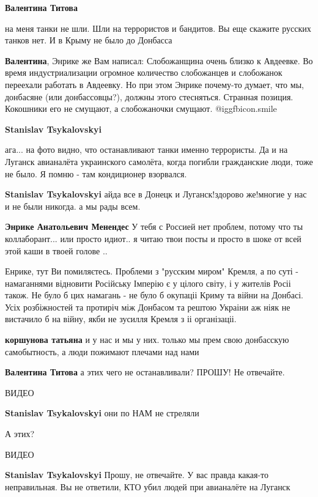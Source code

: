 \begin{itemize}
\begin{itemize}
\textbf{Валентина Титова} 

на меня танки не шли. Шли на террористов и бандитов.
Вы еще скажите русских танков нет.
И в Крыму не было до Донбасса

\textbf{Валентина}, Энрике же Вам написал: Слобожанщина очень близко к Авдеевке. Во время индустриализации огромное количество слобожанцев и слобожанок переехали работать в Авдеевку. Но при этом Энрике почему-то думает, что мы, донбасяне (или донбассовцы?), должны этого стесняться. Странная позиция. Кокошники его не смущают, а слобожаночки смущают.  @igg{fbicon.smile} 

\textbf{Stanislav Tsykalovskyi} 

ага... на фото видно, что останавливают танки именно террористы. Да и на Луганск
авианалёта украинского самолёта, когда погибли гражданские люди, тоже не было.
Я помню - там кондиционер взорвался.

\textbf{Stanislav Tsykalovskyi} айда все в Донецк и Луганск!здорово же!многие у нас и не были никогда. а мы рады всем.

\textbf{Энрике Анатольевич Менендес} У тебя с Россией нет проблем, потому что ты коллаборант... или просто идиот.. я читаю твои посты и просто в шоке от всей этой каши в твоей голове ..


Енрике, тут Ви помиляєтесь. Проблеми з "русским миром" Кремля, а по суті -
намаганнями відновити Російську Імперію є у цілого світу, і у жителів Росіі
також. Не було б цих намагань - не було б окупаціі Криму та війни на Донбасі.
Усіх розбіжностей та протиріч між Донбасом та рештою Украіни аж ніяк не
вистачило б на війну, якби не зусилля Кремля з іі організаціі.

\textbf{коршунова татьяна} и у нас и мы у них. только мы прем свою донбасскую самобытность, а люди пожимают плечами над нами

\textbf{Валентина Титова} а этих чего не останавливали?
ПРОШУ! Не отвечайте.

ВИДЕО

\textbf{Stanislav Tsykalovskyi} они по НАМ не стреляли

А этих?

ВИДЕО

\textbf{Stanislav Tsykalovskyi} Прошу, не отвечайте. У вас правда какая-то неправильная. Вы не ответили, КТО убил людей при авианалёте на Луганск


\end{itemize}
\end{itemize}
